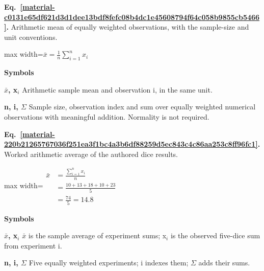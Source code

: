 \documentclass[11pt,a4paper]{article}
\begin{document}
\par\medskip
\noindent\begin{minipage}{\linewidth}
\label{material-c0131e65df621d3d1dee13bdf8fefc08b4dc1e45608794f64c058b9855cb5466}
\noindent\textbf{Eq.~\ref*{material-c0131e65df621d3d1dee13bdf8fefc08b4dc1e45608794f64c058b9855cb5466}.} Arithmetic mean of equally weighted observations, with the sample-size and unit conventions.\par\nopagebreak
\begin{center}\begin{adjustbox}{max width=\linewidth}$\displaystyle \bar{x} = \frac{1}{n} \sum_{i=1}^{n} x_i$\end{adjustbox}\end{center}

\par\noindent\textbf{Symbols}

\par\noindent\textbf{\ensuremath{\bar{x}}, x\ensuremath{{}_i}} Arithmetic sample mean and observation i, in the same unit.

\par\noindent\textbf{n, i, \ensuremath{\Sigma}} Sample size, observation index and sum over equally weighted numerical observations with meaningful addition. Normality is not required.

\end{minipage}\par
\medskip

\par\medskip
\noindent\begin{minipage}{\linewidth}
\label{material-220b21265767036f251ea3f1bc4a3b6df88259d5ec843c4c86aa253c8ff96fc1}
\noindent\textbf{Eq.~\ref*{material-220b21265767036f251ea3f1bc4a3b6df88259d5ec843c4c86aa253c8ff96fc1}.} Worked arithmetic average of the authored dice results.\par\nopagebreak
\begin{center}\begin{adjustbox}{max width=\linewidth}$\displaystyle \begin{aligned}\bar{x}&=\frac{\sum_{i=1}^{n}x_i}{n}\\&=\frac{10+13+18+10+23}{5}\\&=\frac{74}{5}=14.8\end{aligned}$\end{adjustbox}\end{center}

\par\noindent\textbf{Symbols}

\par\noindent\textbf{\ensuremath{\bar{x}}, x\ensuremath{{}_i}} \ensuremath{\bar{x}} is the sample average of experiment sums; x\ensuremath{{}_i} is the observed five-dice sum from experiment i.

\par\noindent\textbf{n, i, \ensuremath{\Sigma}} Five equally weighted experiments; i indexes them; \ensuremath{\Sigma} adds their sums.

\end{minipage}\par
\medskip
\end{document}
